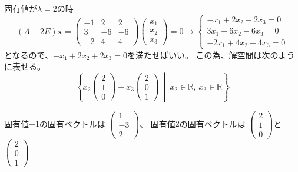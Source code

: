 \documentclass[10pt,a4paper]{ltjsarticle}
\begin{document}
\begin{enumerate}
\begin{enumerate}
              固有値が$\lambda =2$の時
              \begin{equation}
               (A-2E)\bm{x}=
                \begin{pmatrix} -1&2&2\\ 3&-6&-6\\ -2&4&4\end{pmatrix}
                \begin{pmatrix} x_1\\ x_2\\ x_3\end{pmatrix}
                =0
                 \longrightarrow
                 \begin{cases}
                  -x_1 + 2x_2 + 2x_3 =0\\
                  3x_1 - 6x_2 - 6x_3 =0\\
                  -2x_1 + 4x_2 + 4x_3 =0
                 \end{cases}
              \end{equation}
              となるので、$-x_1 + 2x_2 + 2x_3 =0$を満たせばいい。
              この為、解空間は次のように表せる。
              \begin{equation}
               \left\{
                x_2\begin{pmatrix} 2\\ 1\\ 0\end{pmatrix}
                +x_3\begin{pmatrix} 2\\ 0\\ 1\end{pmatrix}
                \ \middle|\
                x_2 \in \mathbb{R}, \
                x_3 \in \mathbb{R}
               \right\}
              \end{equation}

              固有値$-1$の固有ベクトルは
              $\begin{pmatrix} 1\\ -3\\ 2\end{pmatrix}$、
              固有値$2$の固有ベクトルは
              $\begin{pmatrix} 2\\ 1\\ 0\end{pmatrix}$と
              $\begin{pmatrix} 2\\ 0\\ 1\end{pmatrix}$


\end{enumerate}
\end{enumerate}
\end{document}
